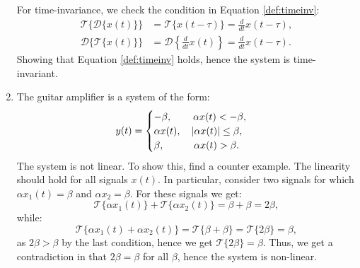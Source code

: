 \begin{enumerate}
For time-invariance, we check the condition in Equation \ref{def:timeinv}:
\begin{align*}
    \mathcal{T}\{\mathcal{D}\{x(t)\}\}&=\mathcal{T}\{x(t-\tau)\}=\frac{d}{dt}x(t-\tau), \\
    \mathcal{D}\{\mathcal{T}\{x(t)\}\}&=\mathcal{D}\left\{\frac{d}{dt}x(t)\right\}=\frac{d}{dt}x(t-\tau).
\end{align*}
Showing that Equation \ref{def:timeinv} holds, hence the system is time-invariant. 

\item The guitar amplifier is a system of the form:
$$y(t)=\begin{cases}
    -\beta, \quad \hspace{0.4cm} \alpha x(t)<-\beta,  \\
    \alpha x(t), \quad |\alpha x(t)|\le \beta, \\
    \beta, \quad \hspace{0.7cm}\alpha x(t)>\beta.
\end{cases}$$
The system is not linear. To show this, find a counter example. The linearity should hold for all signals $x(t)$. 
In particular, consider two signals for which $\alpha x_{1}(t)=\beta$ and $\alpha x_{2}=\beta$. 
For these signals we get:
$$\mathcal{T}\{\alpha x_{1}(t)\}+\mathcal{T}\{\alpha x_{2}(t)\}=\beta+\beta=2\beta,$$
while:
$$\mathcal{T}\{\alpha x_{1}(t)+\alpha x_{2}(t)\}=\mathcal{T}\{\beta+\beta\}=\mathcal{T}\{2\beta\}=\beta,$$
as $2\beta > \beta$ by the last condition, hence we get $\mathcal{T}\{2\beta\}=\beta$. 
Thus, we get a contradiction in that $2\beta=\beta$ for all $\beta$, hence the system is non-linear. 


\end{enumerate}
